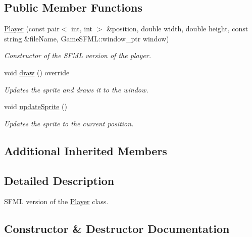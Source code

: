 \subsection*{Public Member Functions}
\begin{DoxyCompactItemize}
\item 
\hyperlink{classGameSFML_1_1Player_a3e69d607a6d700b103ed0454af91ad14}{Player} (const pair$<$ int, int $>$ \&position, double width, double height, const string \&file\+Name, Game\+S\+F\+M\+L\+::window\+\_\+ptr window)
\begin{DoxyCompactList}\small\item\em Constructor of the S\+F\+ML version of the player. \end{DoxyCompactList}\item 
void \hyperlink{classGameSFML_1_1Player_ac694755fafaffdf9432415452c7b9b5b}{draw} () override
\begin{DoxyCompactList}\small\item\em Updates the sprite and draws it to the window. \end{DoxyCompactList}\item 
void \hyperlink{classGameSFML_1_1Player_a8ef838c82c24aa99acd5dd1db17433c2}{update\+Sprite} ()
\begin{DoxyCompactList}\small\item\em Updates the sprite to the current position. \end{DoxyCompactList}\end{DoxyCompactItemize}
\subsection*{Additional Inherited Members}


\subsection{Detailed Description}
S\+F\+ML version of the \hyperlink{classGameSFML_1_1Player}{Player} class. 

\subsection{Constructor \& Destructor Documentation}
\mbox{\label{classGameSFML_1_1Player_a3e69d607a6d700b103ed0454af91ad14}} 
